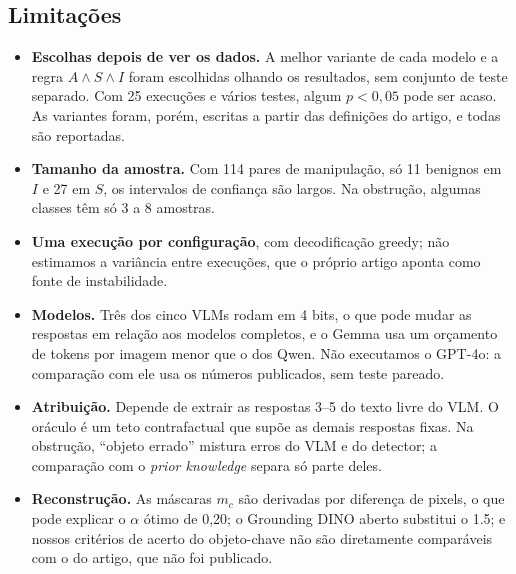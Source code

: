 \documentclass[journal,onecolumn]{IEEEtran}
\begin{document}
\subsection{Limitações}
\begin{itemize}
\item \textbf{Escolhas depois de ver os dados.} A melhor variante de cada modelo e a regra
  $A\wedge S\wedge I$ foram escolhidas olhando os resultados, sem conjunto de teste separado. Com 25
  execuções e vários testes, algum $p<0{,}05$ pode ser acaso. As variantes foram, porém, escritas a
  partir das definições do artigo, e todas são reportadas.
\item \textbf{Tamanho da amostra.} Com 114 pares de manipulação, só 11 benignos em $I$ e 27 em $S$, os
  intervalos de confiança são largos. Na obstrução, algumas classes têm só 3 a 8 amostras.
\item \textbf{Uma execução por configuração}, com decodificação greedy; não estimamos a variância entre
  execuções, que o próprio artigo aponta como fonte de instabilidade.
\item \textbf{Modelos.} Três dos cinco VLMs rodam em 4 bits, o que pode mudar as respostas em relação
  aos modelos completos, e o Gemma usa um orçamento de tokens por imagem menor que o dos Qwen. Não
  executamos o GPT-4o: a comparação com ele usa os números publicados, sem teste pareado.
\item \textbf{Atribuição.} Depende de extrair as respostas 3--5 do texto livre do VLM. O oráculo é um
  teto contrafactual que supõe as demais respostas fixas. Na obstrução, ``objeto errado'' mistura erros
  do VLM e do detector; a comparação com o \emph{prior knowledge} separa só parte deles.
\item \textbf{Reconstrução.} As máscaras $m_c$ são derivadas por diferença de pixels, o que pode explicar
  o $\alpha$ ótimo de 0,20; o Grounding DINO aberto substitui o 1.5; e nossos critérios de acerto do
  objeto-chave não são diretamente comparáveis com o do artigo, que não foi publicado.
\end{itemize}
\end{document}
